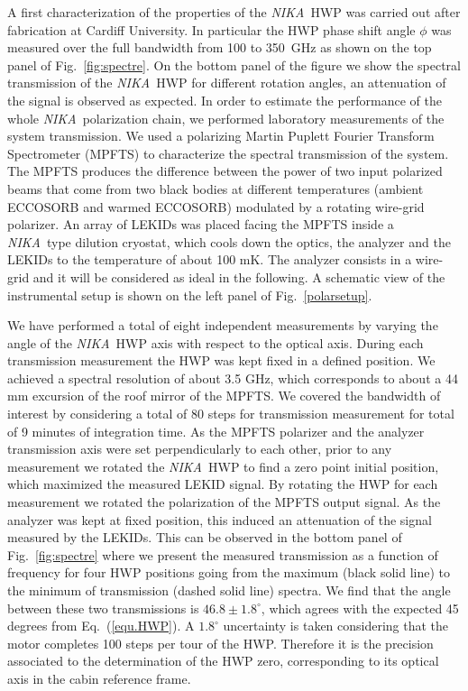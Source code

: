 \documentclass[twocolumn, traditabstract]{aa}
\newcommand{\nika}{{\it NIKA}}
\def\NIKA{\textit{NIKA}}
\begin{document}
A first characterization of the properties of the \nika\ HWP was carried out
after fabrication at Cardiff University. In particular the HWP phase shift angle
$\phi$ was measured over the full bandwidth from 100 to 350~GHz as shown on the
top panel of Fig.~\ref{fig:spectre}. On the bottom panel of the figure we show the spectral transmission of the \NIKA\ HWP for 
different rotation angles, an attenuation of the signal is observed as expected. 
In order to estimate the performance of the whole \nika\ polarization
chain, we performed laboratory measurements of the system transmission.  We used
a polarizing Martin Puplett Fourier Transform Spectrometer (MPFTS) to
characterize the spectral transmission of the system.  The MPFTS produces the
difference between the power of two input polarized beams that come from two
black bodies at different temperatures (ambient ECCOSORB and warmed ECCOSORB)
modulated by a rotating wire-grid polarizer.  An array of LEKIDs was placed
facing the MPFTS inside a \nika\ type dilution cryostat, which cools down the
optics, the analyzer and the LEKIDs to the temperature of about 100 mK.  The analyzer consists in a
wire-grid and it will be considered as ideal in the following.  A schematic
view of the instrumental setup is shown on the left panel of
Fig.~\ref{polarsetup}.

We have performed a total of eight independent measurements by varying the angle
of the \nika\ HWP axis with respect to the optical axis. During each transmission
measurement the HWP was kept fixed in a defined position. We achieved a spectral
resolution of about 3.5 GHz, which corresponds to about a 44 mm excursion of the
roof mirror of the MPFTS. We covered the bandwidth of interest by considering a
total of 80 steps for transmission measurement for total of 9 minutes of
integration time.  As the MPFTS polarizer and the analyzer transmission axis
were set perpendicularly to each other, prior to any measurement we rotated the
\nika\ HWP to find a zero point initial position, which maximized the measured
LEKID signal.  By rotating the HWP for each measurement we rotated the
polarization of the MPFTS output signal.  As the analyzer was kept at fixed
position, this induced an attenuation of the signal measured by the LEKIDs.
This can be observed in the bottom panel of Fig.~\ref{fig:spectre} where we
present the measured transmission as a function of frequency for four HWP
positions going from the maximum (black solid line) to the minimum of
transmission (dashed solid line) spectra. We find that the angle between
these two transmissions is $46.8\pm 1.8^\circ$, which agrees with the expected
45 degrees from Eq.~(\ref{equ.HWP}).
A $1.8^{\circ}$ uncertainty is taken considering that the motor completes 100 steps per tour of the HWP.
Therefore it is the precision associated to the determination of the HWP zero, corresponding to its optical axis
in the cabin reference frame.
\end{document}

